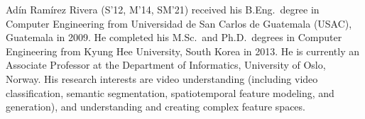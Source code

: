 \documentclass[journal]{IEEEtran}
\begin{document}
\begin{IEEEbiography}{Ad\'{i}n Ram\'{i}rez Rivera} (S'12, M'14, SM'21) received his B.Eng.\ degree in Computer Engineering from Universidad de San Carlos de Guatemala (USAC), Guatemala in 2009.  He completed his M.Sc.\ and Ph.D.\ degrees in Computer Engineering from Kyung Hee University, South Korea in 2013.  He is currently an Associate Professor at the Department of Informatics, University of Oslo, Norway.  His research interests are video understanding (including video classification, semantic segmentation, spatiotemporal feature modeling, and generation), and understanding and creating complex feature spaces.
\end{IEEEbiography}

\vfill
\end{document}
